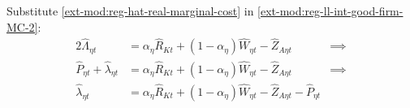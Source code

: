 \documentclass[../thesis.tex]{subfiles}
\begin{document}
Substitute \ref{ext-mod:reg-hat-real-marginal-cost} in \ref{ext-mod:reg-ll-int-good-firm-MC-2}:
\begin{alignat}{2}
	\hat{\Lambda}_{\eta t} &= {\alpha_{\eta}} \hat{R}_{Kt} + (1- {\alpha_{\eta}}) \hat{W}_{\eta t} - \hat{Z}_{A\eta t} &\implies \nonumber \\
	\hat{P}_{\eta t} + \hat{\lambda}_{\eta t} &= {\alpha_{\eta}} \hat{R}_{Kt} + (1- {\alpha_{\eta}}) \hat{W}_{\eta t} - \hat{Z}_{A\eta t} &\implies \nonumber \\
	\hat{\lambda}_{\eta t} &= {\alpha_{\eta}} \hat{R}_{Kt} + (1- {\alpha_{\eta}}) \hat{W}_{\eta t} - \hat{Z}_{A\eta t} - \hat{P}_{\eta t} \label{ext-mod:reg-ll-int-good-firm-MC-3}
\end{alignat}

\begin{comment}

\subsubsection*{Marginal Cost}

Log-linearize \ref{ext-mod:reg-int-good-firm-MC-2}:
\begin{alignat}{2}
	& \Lambda_{\eta t} = Z_{A\eta t}^{-1} \frac{R_{t}^{{\alpha_{\eta}}} W_{\eta t}^{1-\alpha_{\eta}}}{{\alpha_{\eta}}^{{\alpha_{\eta}}} (1-\alpha_{\eta})^{1-\alpha_{\eta}}} \implies \tag{\ref{ext-mod:reg-int-good-firm-MC-2}} \\
	& \Lambda (1+ \hat{\Lambda}_{\eta t}) = \nonumber \\ & \qquad = \frac{1}{Z_{A\eta}} \left( \frac{R_{}}{{\alpha_{\eta}}} \right)^{{\alpha_{\eta}}} \left( \frac{W}{1-\alpha_{\eta}} \right)^{1-\alpha_{\eta}} (1- \hat{Z}_{A\eta t} + {\alpha_{\eta}} \hat{R}_{Kt} + (1- {\alpha_{\eta}}) \hat{W}_{\eta t} ) \implies \nonumber \\
	& \hat{\Lambda}_{\eta t} = {\alpha_{\eta}} \hat{R}_{Kt} + (1- {\alpha_{\eta}}) \hat{W}_{\eta t} - \hat{Z}_{A\eta t} \label{ext-mod:reg-ll-int-good-firm-MC-2}
\end{alignat}
	
\end{comment}




\begin{comment}
	
	Log-linearize \ref{ext-mod:reg-int-good-firm-prod-function} and then substitute \ref{ext-mod:reg-hat-real-marginal-cost}:
	\begin{align}
		\Lambda_{\eta t} &= \frac{W_{\eta t}}{Z_{A\eta t}} \tag{\ref{ext-mod:reg-int-good-firm-prod-function}} \implies \\
		\hat{\Lambda}_{\eta t} &= \hat{W}_{\eta t} - \hat{Z}_{A\eta t} \implies \nonumber \\
		\hat{P}_{\eta t} + \hat{\lambda}_{\eta t} &= \hat{W}_{\eta t} - \hat{Z}_{A\eta t} \label{ext-mod:reg-int-good-firm-FOC-Lt-ll}
	\end{align}
	
\end{comment}
\end{document}
